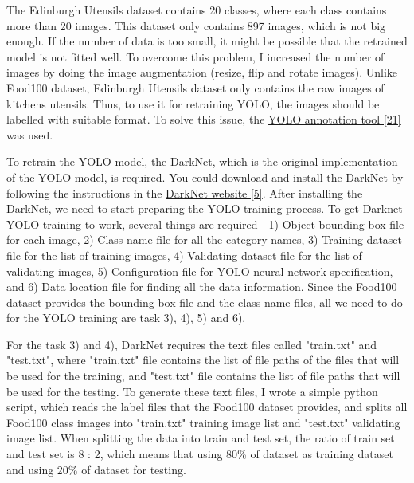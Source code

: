 \documentclass{article}
\begin{document}
The Edinburgh Utensils dataset contains 20 classes, where each class contains more than 20 images. This dataset only contains 897 images, which is not big enough. If the number of data is too small, it might be possible that the retrained model is not fitted well. To overcome this problem, I increased the number of images by doing the image augmentation (resize, flip and rotate images). Unlike Food100 dataset, Edinburgh Utensils dataset only contains the raw images of kitchens utensils. Thus, to use it for retraining YOLO, the images should be labelled with suitable format. To solve this issue, the \hyperlink{ref21}{YOLO annotation tool [21]} was used.

To retrain the YOLO model, the DarkNet, which is the original implementation of the YOLO model, is required. You could download and install the DarkNet by following the instructions in the \hyperlink{ref5}{DarkNet website [5]}. After installing the DarkNet, we need to start preparing the YOLO training process. To get Darknet YOLO training to work, several things are required - 1) Object bounding box file for each image, 2) Class name file for all the category names, 3) Training dataset file for the list of training images, 4) Validating dataset file for the list of validating images, 5) Configuration file for YOLO neural network specification, and 6) Data location file for finding all the data information. Since the Food100 dataset provides the bounding box file and the class name files, all we need to do for the YOLO training are task 3), 4), 5) and 6).

For the task 3) and 4), DarkNet requires the text files called "train.txt" and "test.txt", where "train.txt" file contains the list of file paths of the files that will be used for the training, and "test.txt" file contains the list of file paths that will be used for the testing. To generate these text files, I wrote a simple python script, which reads the label files that the Food100 dataset provides, and splits all Food100 class images into "train.txt" training image list and "test.txt" validating image list. When splitting the data into train and test set, the ratio of train set and test set is 8 : 2, which means that using 80\% of dataset as training dataset and using 20\% of dataset for testing.
\end{document}

